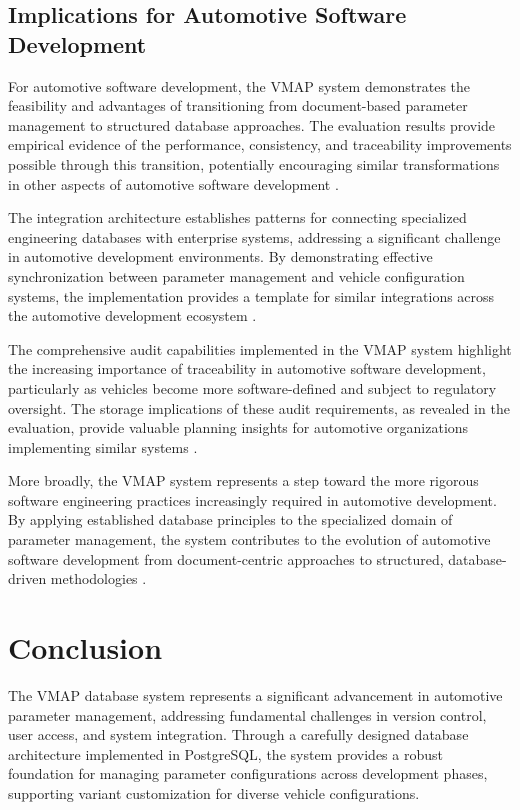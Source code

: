 \subsection{Implications for Automotive Software Development}
\label{subsec:automotive-development-implications}

For automotive software development, the VMAP system demonstrates the feasibility and advantages of transitioning from document-based parameter management to structured database approaches. The evaluation results provide empirical evidence of the performance, consistency, and traceability improvements possible through this transition, potentially encouraging similar transformations in other aspects of automotive software development \cite{broy2006challenges}.

The integration architecture establishes patterns for connecting specialized engineering databases with enterprise systems, addressing a significant challenge in automotive development environments. By demonstrating effective synchronization between parameter management and vehicle configuration systems, the implementation provides a template for similar integrations across the automotive development ecosystem \cite{hohpe2002enterprise}.

The comprehensive audit capabilities implemented in the VMAP system highlight the increasing importance of traceability in automotive software development, particularly as vehicles become more software-defined and subject to regulatory oversight. The storage implications of these audit requirements, as revealed in the evaluation, provide valuable planning insights for automotive organizations implementing similar systems \cite{staron2021automotive}.

More broadly, the VMAP system represents a step toward the more rigorous software engineering practices increasingly required in automotive development. By applying established database principles to the specialized domain of parameter management, the system contributes to the evolution of automotive software development from document-centric approaches to structured, database-driven methodologies \cite{pretschner2007software}.

\section{Conclusion}
\label{sec:final-conclusion}

The VMAP database system represents a significant advancement in automotive parameter management, addressing fundamental challenges in version control, user access, and system integration. Through a carefully designed database architecture implemented in PostgreSQL, the system provides a robust foundation for managing parameter configurations across development phases, supporting variant customization for diverse vehicle configurations.

